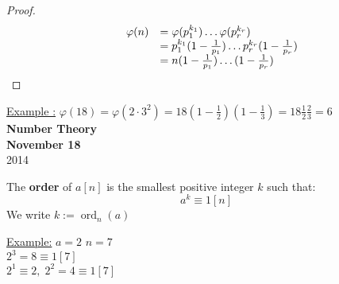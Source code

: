 \documentclass{report}
\DeclareMathOperator{\ord}{ord}
\begin{document}
\begin{proof}
					\[ 	\begin{array}{l c l}
							&\varphi(n)&=\varphi(p_1^{k_1})\dots\varphi(p_r^{k_r})\\
							&&=p_1^{k_1}(1-\frac{1}{p_1})\dots p_r^{k_r}(1-\frac{1}{p_r})\\
							&&=n(1-\frac{1}{p_1})\dots (1-\frac{1}{p_r})\\
							\end{array}
					\]
\end{proof}
\underline{Example :} $\varphi(18)=\varphi(2 \cdot 3^2)=18(1-\frac{1}{2})(1-\frac{1}{3}) = 18 \frac{1}{2} \frac{2}{3}=6$\\
\newpage
{\centering
\Large
\textbf{Number Theory}\\
\normalsize
\textbf{November 18}\\
2014\\
}
\vspace{10mm}
\begin{defi} The \textbf{order} of $a[n]$ is the smallest positive integer $k$ such that:
																\[ a^k \equiv 1 [n] \]
						We write $k:= \ord_n(a)$
\end{defi}
\underline{Example:} $a=2$ $n=7$\\
	$2^3=8 \equiv 1 [7]$\\
	$2^1 \equiv 2, \; 2^2=4\equiv 1 [7]$\\
\end{document}
